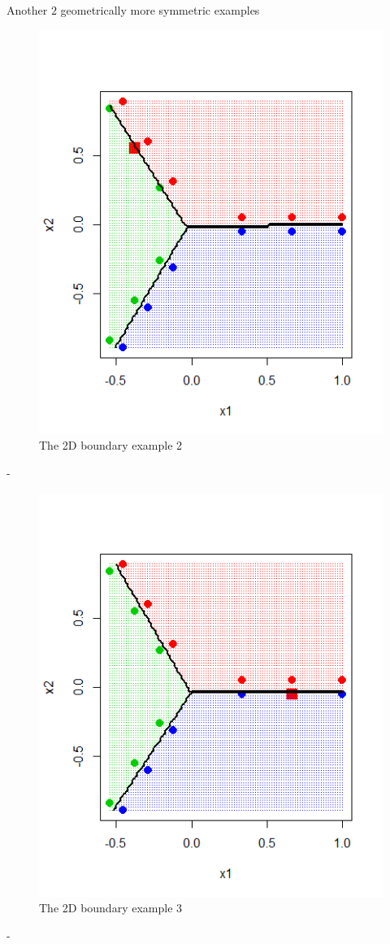 \documentclass{article}
\begin{document}
Another $2$ geometrically more symmetric examples
\begin{figure}[H]
\centering
\includegraphics[width=0.5\linewidth]{test2_18_5}
\caption{The 2D boundary example 2}
\end{figure}
 -
\begin{figure}[H]
\centering
\includegraphics[width=0.5\linewidth]{test2_18_11}
\caption{The 2D boundary example 3}
\end{figure}
 -
\newline \newline
\end{document}
